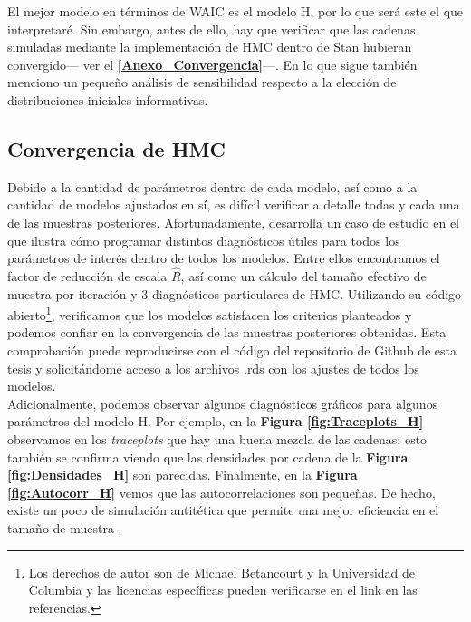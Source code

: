 El mejor modelo en términos de WAIC es el modelo H, por lo que será este el que interpretaré. Sin embargo, antes de ello, hay que verificar que las cadenas simuladas mediante la implementación de HMC dentro de Stan hubieran convergido--- ver el \textbf{\autoref{Anexo_Convergencia}}---. En lo que sigue también menciono un pequeño análisis de sensibilidad respecto a la elección de distribuciones iniciales informativas.

\subsection{Convergencia de HMC}

Debido a la cantidad de parámetros dentro de cada modelo, así como a la cantidad de modelos ajustados en sí, es difícil verificar a detalle todas y cada una de las muestras posteriores. Afortunadamente, \textcite{BetancourtRStanWorkflow} desarrolla un caso de estudio en el que ilustra cómo programar distintos diagnósticos útiles para todos los parámetros de interés dentro de todos los modelos. Entre ellos encontramos el factor de reducción de escala $\hat{R}$, así como un cálculo del tamaño efectivo de muestra por iteración y 3 diagnósticos particulares de HMC. Utilizando su código abierto\footnote{Los derechos de autor son de Michael Betancourt y la Universidad de Columbia y las licencias específicas pueden verificarse en el link en las referencias.}, verificamos que los modelos satisfacen los criterios planteados y podemos confiar en la convergencia de las muestras posteriores obtenidas. Esta comprobación puede reproducirse con el código del repositorio de Github de esta tesis y solicitándome acceso a los archivos .rds con los ajustes de todos los modelos.\\

 Adicionalmente, podemos observar algunos diagnósticos gráficos para algunos parámetros del modelo H. Por ejemplo, en la \textbf{Figura \ref{fig:Traceplots_H}} observamos en los \textit{traceplots} que hay una buena mezcla de las cadenas; esto también se confirma viendo que las densidades por cadena de la \textbf{Figura \ref{fig:Densidades_H}} son parecidas. Finalmente, en la \textbf{Figura \ref{fig:Autocorr_H}} vemos que las autocorrelaciones son pequeñas. De hecho, existe un poco de simulación antitética que permite una mejor eficiencia en el tamaño de muestra \parencite{BlogAntithetical}.\\ 
 
